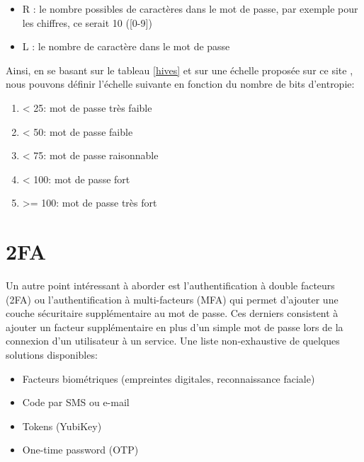 \begin{itemize}
	\item R : le nombre possibles de caractères dans le mot de passe, par exemple pour les chiffres, ce serait 10 ([0-9])
	\item L : le nombre de caractère dans le mot de passe
\end{itemize}

Ainsi, en se basant sur le tableau \ref{hives} et sur une échelle proposée sur ce site \cite{medium}, nous pouvons définir l'échelle suivante en fonction du nombre de bits d'entropie:

\begin{enumerate}
	\item < 25: mot de passe très faible
	\item < 50: mot de passe faible
	\item < 75: mot de passe raisonnable
	\item < 100: mot de passe fort
	\item >= 100: mot de passe très fort
\end{enumerate}

\section{2FA}

Un autre point intéressant à aborder est l'authentification à double facteurs (2FA) ou l'authentification à multi-facteurs (MFA) qui permet d'ajouter une couche sécuritaire supplémentaire au mot de passe. Ces derniers consistent à ajouter un facteur supplémentaire en plus d'un simple mot de passe lors de la connexion d'un utilisateur à un service. Une liste non-exhaustive de quelques solutions disponibles:

\begin{itemize}
	\item Facteurs biométriques (empreintes digitales, reconnaissance faciale)
	\item Code par SMS ou e-mail
	\item Tokens (YubiKey)
	\item One-time password (OTP)
\end{itemize}